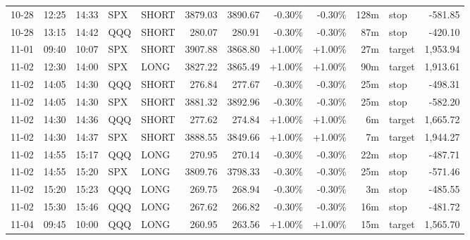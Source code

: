 \documentclass[11pt,a4paper]{article}
\begin{document}
\begin{center}
\begin{longtable}{>{\color{txtmain}}l l l l l r r r r r >{\color{txtmain}}l r}
10-28 & 12:25 & 14:33 & SPX & SHORT & 3879.03 & 3890.67 & \textcolor{lossred}{-0.30\%} & \textcolor{lossred}{-0.30\%} & 128m & stop & \textcolor{lossred}{-581.85} \\
10-28 & 13:15 & 14:42 & QQQ & SHORT & 280.07 & 280.91 & \textcolor{lossred}{-0.30\%} & \textcolor{lossred}{-0.30\%} & 87m & stop & \textcolor{lossred}{-420.10} \\
11-01 & 09:40 & 10:07 & SPX & SHORT & 3907.88 & 3868.80 & \textcolor{wingreen}{+1.00\%} & \textcolor{wingreen}{+1.00\%} & 27m & target & \textcolor{wingreen}{1,953.94} \\
11-02 & 12:30 & 14:00 & SPX & LONG & 3827.22 & 3865.49 & \textcolor{wingreen}{+1.00\%} & \textcolor{wingreen}{+1.00\%} & 90m & target & \textcolor{wingreen}{1,913.61} \\
11-02 & 14:05 & 14:30 & QQQ & SHORT & 276.84 & 277.67 & \textcolor{lossred}{-0.30\%} & \textcolor{lossred}{-0.30\%} & 25m & stop & \textcolor{lossred}{-498.31} \\
11-02 & 14:05 & 14:30 & SPX & SHORT & 3881.32 & 3892.96 & \textcolor{lossred}{-0.30\%} & \textcolor{lossred}{-0.30\%} & 25m & stop & \textcolor{lossred}{-582.20} \\
11-02 & 14:30 & 14:36 & QQQ & SHORT & 277.62 & 274.84 & \textcolor{wingreen}{+1.00\%} & \textcolor{wingreen}{+1.00\%} & 6m & target & \textcolor{wingreen}{1,665.72} \\
11-02 & 14:30 & 14:37 & SPX & SHORT & 3888.55 & 3849.66 & \textcolor{wingreen}{+1.00\%} & \textcolor{wingreen}{+1.00\%} & 7m & target & \textcolor{wingreen}{1,944.27} \\
11-02 & 14:55 & 15:17 & QQQ & LONG & 270.95 & 270.14 & \textcolor{lossred}{-0.30\%} & \textcolor{lossred}{-0.30\%} & 22m & stop & \textcolor{lossred}{-487.71} \\
11-02 & 14:55 & 15:20 & SPX & LONG & 3809.76 & 3798.33 & \textcolor{lossred}{-0.30\%} & \textcolor{lossred}{-0.30\%} & 25m & stop & \textcolor{lossred}{-571.46} \\
11-02 & 15:20 & 15:23 & QQQ & LONG & 269.75 & 268.94 & \textcolor{lossred}{-0.30\%} & \textcolor{lossred}{-0.30\%} & 3m & stop & \textcolor{lossred}{-485.55} \\
11-02 & 15:30 & 15:46 & QQQ & LONG & 267.62 & 266.82 & \textcolor{lossred}{-0.30\%} & \textcolor{lossred}{-0.30\%} & 16m & stop & \textcolor{lossred}{-481.72} \\
11-04 & 09:45 & 10:00 & QQQ & LONG & 260.95 & 263.56 & \textcolor{wingreen}{+1.00\%} & \textcolor{wingreen}{+1.00\%} & 15m & target & \textcolor{wingreen}{1,565.70} \\

\end{longtable}
\end{center}
\end{document}
